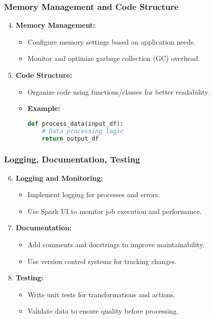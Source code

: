 \documentclass[aspectratio=169]{beamer}
\begin{document}
\begin{frame}[fragile]
    \frametitle{Memory Management and Code Structure}
    \begin{enumerate}
        \setcounter{enumi}{3}
        \item \textbf{Memory Management:}
        \begin{itemize}
            \item Configure memory settings based on application needs.
            \item Monitor and optimize garbage collection (GC) overhead.
        \end{itemize}
        
        \item \textbf{Code Structure:}
        \begin{itemize}
            \item Organize code using functions/classes for better readability.
            \item \textbf{Example:}
            \begin{lstlisting}[language=Python]
def process_data(input_df):
    # Data processing logic
    return output_df
            \end{lstlisting}
        \end{itemize}
    \end{enumerate}
\end{frame}

\begin{frame}[fragile]
    \frametitle{Logging, Documentation, Testing}
    \begin{enumerate}
        \setcounter{enumi}{5}
        \item \textbf{Logging and Monitoring:}
        \begin{itemize}
            \item Implement logging for processes and errors.
            \item Use Spark UI to monitor job execution and performance.
        \end{itemize}
        
        \item \textbf{Documentation:}
        \begin{itemize}
            \item Add comments and docstrings to improve maintainability.
            \item Use version control systems for tracking changes.
        \end{itemize}

        \item \textbf{Testing:}
        \begin{itemize}
            \item Write unit tests for transformations and actions.
            \item Validate data to ensure quality before processing.
        \end{itemize}
    \end{enumerate}
\end{frame}
\end{document}
